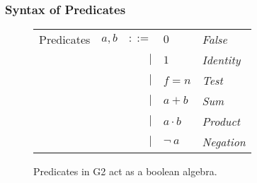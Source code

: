 \documentclass[sigconf,usenames,dvipsnames,svgnames,table]{acmart}
\def \sysname {\textsc{G2}\xspace}
\begin{document}
      \subsubsection{Syntax of Predicates}\label{sec:spec:synt:pred}
        \begin{figure}
          \centering
          \begin{tabular}{l c r l l}
            Predicates  & $a,b$ & $::=$  & $0$          & \textit{False}    \\
                        &       & $\mid$ & $1$          & \textit{Identity} \\
                        &       & $\mid$ & $f = n$      & \textit{Test}     \\
                        &       & $\mid$ & $a + b$      & \textit{Sum}      \\
                        &       & $\mid$ & $a \cdot b$  & \textit{Product}  \\
                        &       & $\mid$ & $\neg\ a$    & \textit{Negation}
          \end{tabular}
          \caption{Predicates in \sysname act as a boolean algebra.}
          \label{fig:spec:synt:pred}
        \end{figure}

\end{document}
